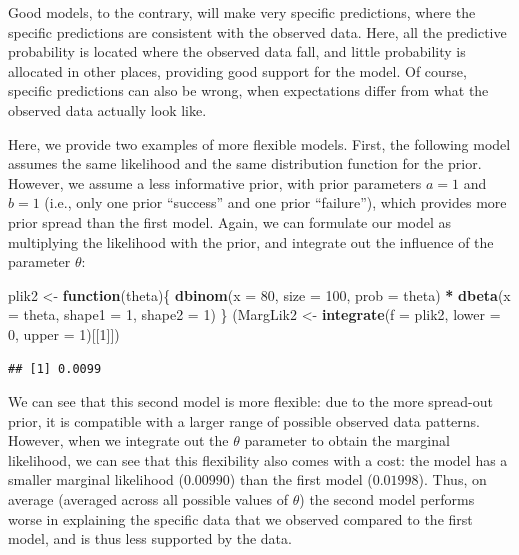 \documentclass[12pt,]{krantz}
\newenvironment{Shaded}{\begin{snugshade}}{\end{snugshade}}
\newcommand{\KeywordTok}[1]{\textcolor[rgb]{0.13,0.29,0.53}{\textbf{#1}}}
\newcommand{\DataTypeTok}[1]{\textcolor[rgb]{0.13,0.29,0.53}{#1}}
\newcommand{\DecValTok}[1]{\textcolor[rgb]{0.00,0.00,0.81}{#1}}
\newcommand{\StringTok}[1]{\textcolor[rgb]{0.31,0.60,0.02}{#1}}
\newcommand{\ControlFlowTok}[1]{\textcolor[rgb]{0.13,0.29,0.53}{\textbf{#1}}}
\newcommand{\OperatorTok}[1]{\textcolor[rgb]{0.81,0.36,0.00}{\textbf{#1}}}
\newcommand{\NormalTok}[1]{#1}
\theoremstyle{definition}
\theoremstyle{definition}
\theoremstyle{definition}
\theoremstyle{remark}
\begin{document}
Good models, to the contrary, will make very specific predictions, where
the specific predictions are consistent with the observed data. Here,
all the predictive probability is located where the observed data fall,
and little probability is allocated in other places, providing good
support for the model. Of course, specific predictions can also be
wrong, when expectations differ from what the observed data actually
look like.

Here, we provide two examples of more flexible models. First, the
following model assumes the same likelihood and the same distribution
function for the prior. However, we assume a less informative prior,
with prior parameters \(a = 1\) and \(b = 1\) (i.e., only one prior
``success'' and one prior ``failure''), which provides more prior spread
than the first model. Again, we can formulate our model as multiplying
the likelihood with the prior, and integrate out the influence of the
parameter \(\theta\):

\begin{Shaded}
\begin{Highlighting}[]
\NormalTok{plik2 <-}\StringTok{ }\ControlFlowTok{function}\NormalTok{(theta)\{}
  \KeywordTok{dbinom}\NormalTok{(}\DataTypeTok{x =} \DecValTok{80}\NormalTok{, }\DataTypeTok{size =} \DecValTok{100}\NormalTok{, }\DataTypeTok{prob =}\NormalTok{ theta) }\OperatorTok{*}
\StringTok{    }\KeywordTok{dbeta}\NormalTok{(}\DataTypeTok{x =}\NormalTok{ theta, }\DataTypeTok{shape1 =} \DecValTok{1}\NormalTok{, }\DataTypeTok{shape2 =} \DecValTok{1}\NormalTok{)}
\NormalTok{\}}
\NormalTok{(MargLik2 <-}\StringTok{ }\KeywordTok{integrate}\NormalTok{(}\DataTypeTok{f =}\NormalTok{ plik2, }\DataTypeTok{lower =} \DecValTok{0}\NormalTok{, }\DataTypeTok{upper =} \DecValTok{1}\NormalTok{)[[}\DecValTok{1}\NormalTok{]])}
\end{Highlighting}
\end{Shaded}

\begin{verbatim}
## [1] 0.0099
\end{verbatim}

We can see that this second model is more flexible: due to the more
spread-out prior, it is compatible with a larger range of possible
observed data patterns. However, when we integrate out the \(\theta\)
parameter to obtain the marginal likelihood, we can see that this
flexibility also comes with a cost: the model has a smaller marginal
likelihood (\(0.00990\)) than the first model (\(0.01998\)). Thus, on
average (averaged across all possible values of \(\theta\)) the second
model performs worse in explaining the specific data that we observed
compared to the first model, and is thus less supported by the data.
\end{document}
